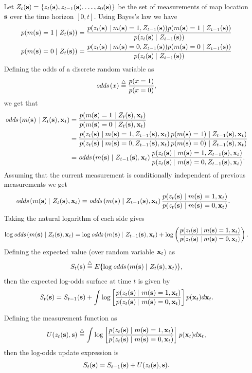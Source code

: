 Let $Z_t(\mathbf{s}) = \{z_t(\mathbf{s}), z_{t-1}(\mathbf{s}), \dots, z_0(\mathbf{s})\}$ be the set of measurements of map location $\mathbf{s}$ over the time horizon $[0, t]$.  Using Bayes's law we have
\begin{align*}
	p(m(\mathbf{s})=1 \mid Z_t(\mathbf{s})) &= \frac{p(z_t(\mathbf{s})\mid m(\mathbf{s})=1, Z_{t-1}(\mathbf{s})) p(m(\mathbf{s})=1 \mid Z_{t-1}(\mathbf{s}))}{p(z_t(\mathbf{s}) \mid Z_{t-1}(\mathbf{s}))} \\
	p(m(\mathbf{s})=0 \mid Z_t(\mathbf{s})) &= \frac{p(z_t(\mathbf{s})\mid m(\mathbf{s})=0, Z_{t-1}(\mathbf{s})) p(m(\mathbf{s})=0 \mid Z_{t-1}(\mathbf{s}))}{p(z_t(\mathbf{s}) \mid Z_{t-1}(\mathbf{s}))}
\end{align*}
Defining the odds of a discrete random variable as
\[
\text{\em odds}\left(x\right) \stackrel{\triangle}{=} \frac{p(x=1)}{p(x=0)},
\]
we get that 
\begin{align*}
	\text{\em odds}\left(m(\mathbf{s})\mid Z_t(\mathbf{s}), \mathbf{x}_t\right) &= \frac{p(m(\mathbf{s})=1 \mid Z_t(\mathbf{s}), \mathbf{x}_t)}{p(m(\mathbf{s})=0 \mid Z_t(\mathbf{s}), \mathbf{x}_t)} \\
	&= \frac{p(z_t(\mathbf{s}) \mid m(\mathbf{s})=1, Z_{t-1}(\mathbf{s}), \mathbf{x}_t) \, p(m(\mathbf{s})=1)\mid Z_{t-1}(\mathbf{s}), \mathbf{x}_t)}{p(z_t(\mathbf{s})\mid m(\mathbf{s})=0, Z_{t-1}(\mathbf{s}), \mathbf{x}_t) \, p(m(\mathbf{s})=0)\mid Z_{t-1}(\mathbf{s}), \mathbf{x}_t)} \\
	&= \text{\em odds}\left(m(\mathbf{s}) \mid Z_{t-1}(\mathbf{s}), \mathbf{x}_t\right)  \frac{p(z_t(\mathbf{s})\mid m(\mathbf{s})=1, Z_{t-1}(\mathbf{s}), \mathbf{x}_t)}{p(z_t(\mathbf{s})\mid m(\mathbf{s})=0, Z_{t-1}(\mathbf{s}), \mathbf{x}_t)}.
\end{align*}
Assuming that the current measurement is conditionally independent of previous measurements we get
\begin{align*}
	\text{\em odds}\left(m(\mathbf{s})\mid Z_t(\mathbf{s}), \mathbf{x}_t\right) 
		&= \text{\em odds}\left(m(\mathbf{s}) \mid Z_{t-1}(\mathbf{s}), \mathbf{x}_t\right)  \frac{p(z_t(\mathbf{s})\mid m(\mathbf{s})=1, \mathbf{x}_t)}{p(z_t(\mathbf{s})\mid m(\mathbf{s})=0, \mathbf{x}_t)}.
\end{align*}
Taking the natural logarithm of each side gives
\[
\log\text{\em odds}\left(m(\mathbf{s})\mid Z_t(\mathbf{s}), \mathbf{x}_t\right) = \log \text{\em odds}\left(m(\mathbf{s}) \mid Z_{t-1}(\mathbf{s}), \mathbf{x}_t\right) + \log\left(\frac{p(z_t(\mathbf{s})\mid m(\mathbf{s})=1, \mathbf{x}_t)}{p(z_t(\mathbf{s})\mid m(\mathbf{s})=0, \mathbf{x}_t)}\right).
\]
Defining the expected value (over random variable $\mathbf{x}_t$) as
\[
S_t(\mathbf{s}) \stackrel{\triangle}{=} E\{\log\text{\em odds}\left(m(\mathbf{s})\mid Z_t(\mathbf{s}), \mathbf{x}_t\right)\},
\]
then the expected log-odds surface at time $t$ is given by
\[
S_t(\mathbf{s}) = S_{t-1}(\mathbf{s}) + \int\log\left[ \frac{p(z_t(\mathbf{s})\mid m(\mathbf{s})=1, \mathbf{x}_t)}{p(z_t(\mathbf{s})\mid m(\mathbf{s})=0, \mathbf{x}_t)}\right]p(\mathbf{x}_t)d\mathbf{x}_t.
\] 

Defining the measurement function as 
\begin{equation} \label{eq:measurement_function}
U(z_t(\sbf), \sbf) \defeq \int\log\left[ \frac{p(z_t(\sbf)\mid m(\sbf)=1, \xbf_t)}{p(z_t(\sbf)\mid m(\sbf)=0, \xbf_t)}\right]p(\xbf_t)d\xbf_t,	
\end{equation}
then the log-odds update expression is
\begin{equation}\label{eq:log_odds_surface_update}
S_t(\sbf) = S_{t-1}(\sbf) + U(z_t(\sbf), \sbf).
\end{equation}

